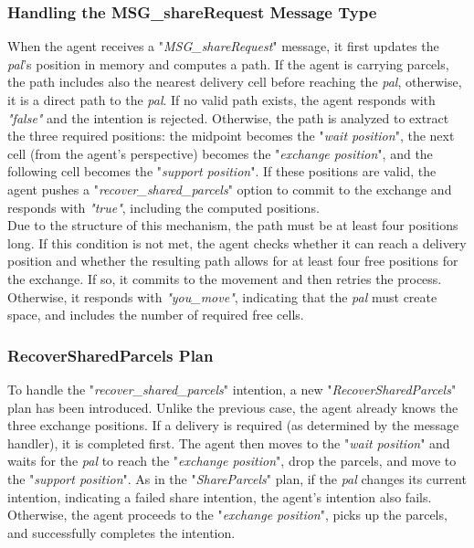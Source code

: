         
        \subsubsection{Handling the MSG\_shareRequest Message Type}
            When the agent receives a "\textit{MSG\_shareRequest}" message, it first updates the \textit{pal}'s position in memory and computes a path. If the agent is carrying parcels, the path includes also the nearest delivery cell before reaching the \textit{pal}, otherwise, it is a direct path to the \textit{pal}. If no valid path exists, the agent responds with \textit{"false"} and the intention is rejected. Otherwise, the path is analyzed to extract the three required positions: the midpoint becomes the "\textit{wait position}", the next cell (from the agent's perspective) becomes the "\textit{exchange position}", and the following cell becomes the "\textit{support position}". If these positions are valid, the agent pushes a "\textit{recover\_shared\_parcels}" option to commit to the exchange and responds with \textit{"true"}, including the computed positions.
            \medskip\\
            Due to the structure of this mechanism, the path must be at least four positions long. If this condition is not met, the agent checks whether it can reach a delivery position and whether the resulting path allows for at least four free positions for the exchange. If so, it commits to the movement and then retries the process. Otherwise, it responds with \textit{"you\_move"}, indicating that the \textit{pal} must create space, and includes the number of required free cells.
            
        \subsubsection{RecoverSharedParcels Plan}
            To handle the "\textit{recover\_shared\_parcels}" intention, a new "\textit{RecoverSharedParcels}" plan has been introduced. Unlike the previous case, the agent already knows the three exchange positions. If a delivery is required (as determined by the message handler), it is completed first. The agent then moves to the "\textit{wait position}" and waits for the \textit{pal} to reach the "\textit{exchange position}", drop the parcels, and move to the "\textit{support position}". As in the "\textit{ShareParcels}" plan, if the \textit{pal} changes its current intention, indicating a failed share intention, the agent's intention also fails. Otherwise, the agent proceeds to the "\textit{exchange position}", picks up the parcels, and successfully completes the intention.

